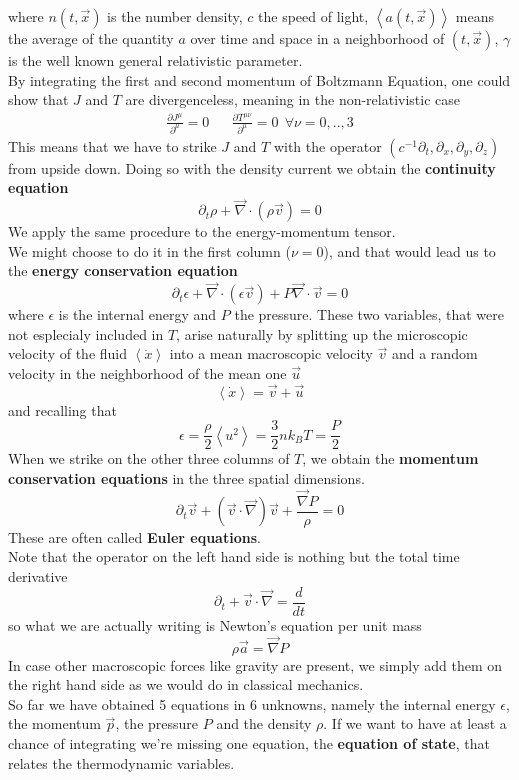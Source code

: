 \documentclass[11pt]{article}
\begin{document}
where $n(t, \vec{x})$ is the number density, $c$ the speed of light,  $\left< a(t,\vec{x}) \right>$ means the average of the quantity $a$ over time and space in a neighborhood of $(t, \vec{x})$, $\gamma$ is the well known general relativistic parameter.\\
By integrating the first and second momentum of Boltzmann Equation, one could show that $J$ and $T$ are divergenceless, meaning in the non-relativistic case
\begin{align}
\frac{\partial J^{\mu}}{\partial^{\mu}}=0 && \frac{\partial T^{\mu \nu}}{\partial^{\mu}}=0 \  \  \forall \nu =0,..,3 
\end{align}
This means that we have to strike $J$ and $T$ with the operator $(c^{-1}\partial_t,\partial_x,\partial_y,\partial_z)$ from upside down. Doing so with the density current we obtain the \textbf{continuity equation}
\begin{equation} \label{cont}
\partial_t \rho + \vec\nabla \cdot (\rho \vec{v})=0
\end{equation}
We apply the same procedure to the energy-momentum tensor.\\
We might choose to do it in the first column ($\nu=0$), and that would lead us to the \textbf{energy conservation equation}
\begin{equation} \label{consen}
\partial_t \epsilon + \vec \nabla \cdot (\epsilon \vec{v}) + P\vec \nabla \cdot \vec{v}=0
\end{equation}
where $\epsilon$ is the internal energy and $P$ the pressure. These two variables, that were not esplecialy included in $T$, arise naturally by splitting up the microscopic velocity of the fluid $\left <  \dot{x} \right >$ into a mean macroscopic velocity $\vec{v}$ and a random velocity in the neighborhood of the mean one $\vec{u}$
$$\left <  \dot{x} \right >= \vec{v}  +  \vec{u} $$
and recalling that 
$$\epsilon = \frac{\rho}{2} \left <  u^2 \right > = \frac{3}{2} n k_B T= \frac{P}{2}$$
When we strike on the other three columns of $T$, we obtain the \textbf{momentum conservation equations} in the three spatial dimensions.
\begin{equation} \label{euler}
\partial_t \vec{v} + (\vec{v} \cdot \vec \nabla) \vec{v} + \frac{\vec \nabla P}{\rho}=0
\end{equation}
These are often called \textbf{Euler equations}. \\
Note that the operator on the left hand side is nothing but the total time derivative
$$
\partial_t + \vec{v} \cdot \vec \nabla = \frac{d}{dt}
$$
so what we are actually writing is Newton's equation per unit mass
$$
\rho \vec{a} = \vec \nabla P
$$
In case other macroscopic forces like gravity are present, we simply add them on the right hand side as we would do in classical mechanics. \\
So far we have obtained 5 equations in 6 unknowns, namely the internal energy $\epsilon$, the momentum $\vec{p}$, the pressure $P$ and the density $\rho$. If we want to have at least a chance of integrating we're missing one equation, the \textbf{equation of state}, that relates the thermodynamic variables.
\end{document}
